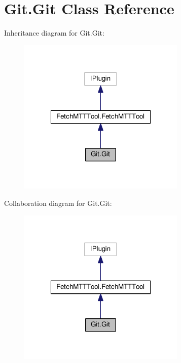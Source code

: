 \hypertarget{class_git_1_1_git}{\section{Git.\-Git Class Reference}
\label{class_git_1_1_git}
}


Inheritance diagram for Git.\-Git\-:
\nopagebreak
\begin{figure}[H]
\begin{center}
\leavevmode
\includegraphics[width=226pt]{class_git_1_1_git__inherit__graph}
\end{center}
\end{figure}


Collaboration diagram for Git.\-Git\-:
\nopagebreak
\begin{figure}[H]
\begin{center}
\leavevmode
\includegraphics[width=226pt]{class_git_1_1_git__coll__graph}
\end{center}
\end{figure}
